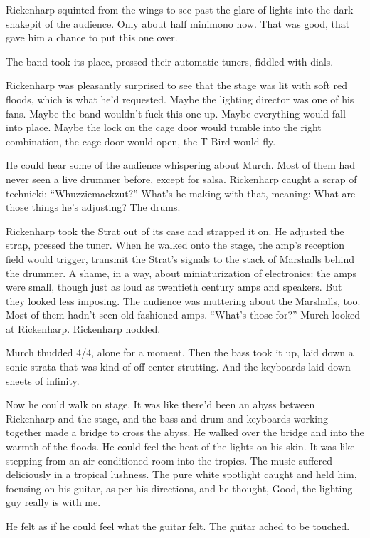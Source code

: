 Rickenharp squinted from the wings to see past the glare of lights into the dark snakepit of the audience. Only about half minimono now. That was good, that gave him a chance to put this one over.

The band took its place, pressed their automatic tuners, fiddled with dials.

Rickenharp was pleasantly surprised to see that the stage was lit with soft red floods, which is what he'd requested. Maybe the lighting director was one of his fans. Maybe the band wouldn't fuck this one up. Maybe everything would fall into place. Maybe the lock on the cage door would tumble into the right combination, the cage door would open, the T-Bird would fly.

He could hear some of the audience whispering about Murch. Most of them had never seen a live drummer before, except for salsa. Rickenharp caught a scrap of technicki: ``Whuzziemackzut?'' What's he making with that, meaning: What are those things he's adjusting? The drums.

Rickenharp took the Strat out of its case and strapped it on. He adjusted the strap, pressed the tuner. When he walked onto the stage, the amp's reception field would trigger, transmit the Strat's signals to the stack of Marshalls behind the drummer. A shame, in a way, about miniaturization of electronics: the amps were small, though just as loud as twentieth century amps and speakers. But they looked less imposing. The audience was muttering about the Marshalls, too. Most of them hadn't seen old-fashioned amps. ``What's those for?'' Murch looked at Rickenharp. Rickenharp nodded.

Murch thudded 4/4, alone for a moment. Then the bass took it up, laid down a sonic strata that was kind of off-center strutting. And the keyboards laid down sheets of infinity.

Now he could walk on stage. It was like there'd been an abyss between Rickenharp and the stage, and the bass and drum and keyboards working together made a bridge to cross the abyss. He walked over the bridge and into the warmth of the floods. He could feel the heat of the lights on his skin. It was like stepping from an air-conditioned room into the tropics. The music suffered deliciously in a tropical lushness. The pure white spotlight caught and held him, focusing on his guitar, as per his directions, and he thought, Good, the lighting guy really is with me.

He felt as if he could feel what the guitar felt. The guitar ached to be touched.

